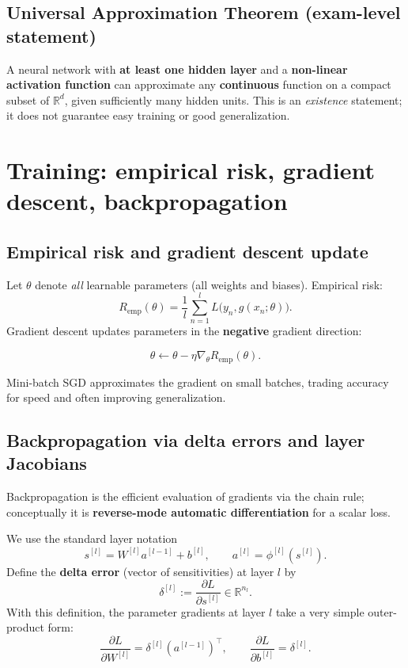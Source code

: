 \documentclass[11pt, oneside]{book}
\newcommand{\R}{\mathbb{R}}
\newcommand{\1}{\ind}                       %
\begin{document}
\subsection{Universal Approximation Theorem (exam-level statement)}
A neural network with \textbf{at least one hidden layer} and a \textbf{non-linear activation function} can approximate any \textbf{continuous} function on a compact subset of $\R^d$, given sufficiently many hidden units. This is an \emph{existence} statement; it does not guarantee easy training or good generalization.

\section{Training: empirical risk, gradient descent, backpropagation}
\subsection{Empirical risk and gradient descent update}
Let $\theta$ denote \emph{all} learnable parameters (all weights and biases). Empirical risk:
\[
R_{\mathrm{emp}}(\theta)=\frac{1}{l}\sum_{n=1}^{l} L\big(y_n, g(x_n;\theta)\big).
\]
Gradient descent updates parameters in the \textbf{negative} gradient direction:
\begin{thmbox}[title={Gradient Descent Parameter Update}]
\[
\theta \leftarrow \theta - \eta \nabla_{\theta} R_{\mathrm{emp}}(\theta).
\]
\end{thmbox}
Mini-batch SGD approximates the gradient on small batches, trading accuracy for speed and often improving generalization.

\subsection{Backpropagation via delta errors and layer Jacobians}
Backpropagation is the efficient evaluation of gradients via the chain rule; conceptually it is \textbf{reverse-mode automatic differentiation} for a scalar loss.

We use the standard layer notation
\[
s^{[l]} = W^{[l]} a^{[l-1]} + b^{[l]},\qquad a^{[l]}=\phi^{[l]}(s^{[l]}).
\]
Define the \textbf{delta error} (vector of sensitivities) at layer $l$ by
\[
\delta^{[l]} := \frac{\partial L}{\partial s^{[l]}} \in \R^{n_l}.
\]
With this definition, the parameter gradients at layer $l$ take a very simple outer-product form:
\[
\frac{\partial L}{\partial W^{[l]}} = \delta^{[l]}(a^{[l-1]})^\top,
\qquad
\frac{\partial L}{\partial b^{[l]}} = \delta^{[l]}.
\]
\end{document}
